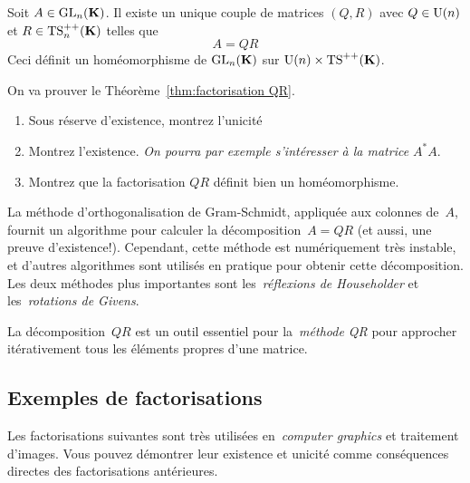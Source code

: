 \begin{theorem}
\label{thm:factorisation QR}
Soit $A \in\mathrm{GL}_n(\mathbf{K})$. Il existe un unique couple de matrices $(Q,R)$ avec $Q
\in \mathrm{U}(n)$ et $R \in \mathrm{TS}^{++}_n(\mathbf{K})$ telles que
\begin{displaymath}
A = QR
\end{displaymath}
Ceci définit un homéomorphisme de $\mathrm{GL}_n(\mathbf{K})$ sur $\mathrm{U}(n)\times\mathrm{TS}^{++}(\mathbf{K})$.
\end{theorem}

\begin{exercice}
On va prouver le Théorème~\ref{thm:factorisation QR}.
\begin{enumerate}
\item Sous réserve d'existence, montrez l'unicité
\item Montrez l'existence. \emph{On pourra par exemple s'intéresser à la matrice $A^*A$}.
\item Montrez que la factorisation $QR$ définit bien un homéomorphisme.
\end{enumerate}
\end{exercice}

La méthode d'orthogonalisation de Gram-Schmidt, appliquée aux colonnes
de~$A$, fournit un algorithme pour calculer la décomposition~$A=QR$ (et
aussi, une preuve d'existence!).  Cependant, cette méthode est numériquement
très instable, et d'autres algorithmes sont utilisés en pratique pour obtenir
cette décomposition.  Les deux méthodes plus importantes sont
les~\emph{réflexions de Householder} et les~\emph{rotations de Givens}.

La décomposition~$QR$ est un outil essentiel pour la~\emph{méthode QR} pour
approcher itérativement tous les éléments propres d'une matrice.




\subsection{Exemples de factorisations}

Les factorisations suivantes sont très utilisées en~\emph{computer graphics}
et traitement d'images.  Vous pouvez démontrer leur existence et unicité
comme conséquences directes des factorisations antérieures.

